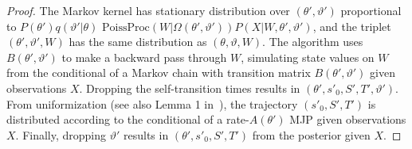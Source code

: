 \begin{proof}
The Markov kernel has stationary distribution over $(\theta',\vartheta')$ proportional to
$P(\theta')q(\vartheta'|\theta)$ $\text{PoissProc}(W|\Omega(\theta',\vartheta'))
P(X|W,\theta',\vartheta')$, and the triplet $(\theta', \vartheta',W)$ has the same distribution as $(\theta, \vartheta,W)$.
The algorithm uses $B(\theta',\vartheta')$ to make a backward pass through $W$, simulating state values on $W$ from the conditional of a Markov chain with transition matrix $B(\theta',\vartheta')$ given observations $X$. 
Dropping the self-transition times results in $(\theta', s'_0, S', T', \vartheta')$. 
From uniformization (see also Lemma 1 in~\cite{RaoTeh13}), the trajectory $(s'_0, S', T')$ is distributed according to the conditional of a rate-$A(\theta')$ MJP given observations $X$.
Finally, dropping $\vartheta'$ 
results in $(\theta',s'_0,S',T')$ from the posterior given $X$.

\end{proof}
